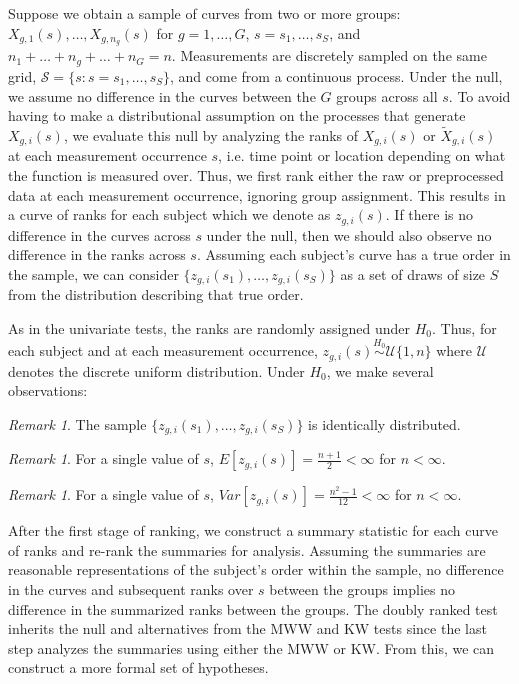 \documentclass[12pt]{article}
\theoremstyle{plain}
\theoremstyle{remark}
\newtheorem{remark}[theorem]{Remark}
\begin{document}
	Suppose we obtain a sample of curves from two or more groups: $X_{g,1}(s), \ldots, X_{g, n_g}(s)$ for $g = 1, \ldots, G$, $s = s_1, \ldots, s_S$, and $n_1 + \ldots + n_g + \ldots + n_G = n$. Measurements are discretely sampled on the same grid, $\mathcal{S} = \{s : s = s_1, \ldots, s_S\}$, and come from a continuous process. Under the null, we assume no difference in the curves between the $G$ groups across all $s$. To avoid having to make a distributional assumption on the processes that generate $X_{g,i}(s)$, we evaluate this null by analyzing the ranks of $X_{g,i}(s)$ or $\tilde{X}_{g,i}(s)$ at each measurement occurrence $s$, i.e. time point or location depending on what the function is measured over. Thus, we first rank either the raw or preprocessed data at each measurement occurrence, ignoring group assignment. This results in a curve of ranks for each subject which we denote as $z_{g,i}(s)$. If there is no difference in the curves across $s$ under the null, then we should also observe no difference in the ranks across $s$. Assuming each subject's curve has a true order in the sample, we can consider $\{z_{g,i}(s_1), \ldots, z_{g,i}(s_S)\}$ as a set of draws of size $S$ from the distribution describing that true order.
	
	As in the univariate tests, the ranks are randomly assigned under $H_0$. Thus, for each subject and at each measurement occurrence, $z_{g,i}(s) \stackrel{H_0}{\sim} \mathcal{U}\{1,n\}$ where $\mathcal{U}$ denotes the discrete uniform distribution. Under $H_0$, we make several observations:
	
	\begin{remark}\label{rm:id}
		The sample  $\{z_{g,i}(s_1), \ldots, z_{g,i}(s_S)\}$ is identically distributed.
	\end{remark}

	\begin{remark}\label{rm:ev}
		For a single value of $s$, $E[z_{g,i}(s)] = \frac{n+1}{2} < \infty$ for $n < \infty$.
	\end{remark}

	\begin{remark}\label{rm:var}
		For a single value of $s$, $Var[z_{g,i}(s)] = \frac{n^2 - 1}{12} < \infty$ for $n < \infty$.
	\end{remark}		
	 After the first stage of ranking, we construct a summary statistic for each curve of ranks and re-rank the summaries for analysis. Assuming the summaries are reasonable representations of the subject's order within the sample, no difference in the curves and subsequent ranks over $s$ between the groups implies no difference in the summarized ranks between the groups. The doubly ranked test inherits the null and alternatives from the MWW and KW tests since the last step analyzes the summaries using either the MWW or KW. From this, we can construct a more formal set of hypotheses.
	 
\end{document}
